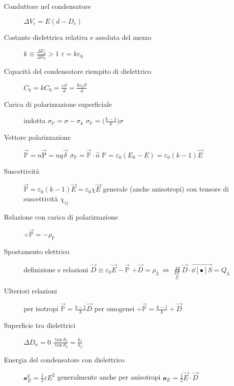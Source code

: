 \documentclass[10pt, oneside]{article}
\begin{document}
\begin{description}
\item[Conduttore nel condensatore] \hfill $\displaystyle \Delta V_c = E (d - D_c)$

\item[Costante dielettrica relativa e assoluta del mezzo] \hfill $\displaystyle k \equiv \frac{\Delta V_0}{\Delta V_k} > 1$ \qquad $\displaystyle \varepsilon = k \varepsilon_0$

\item[Capacità del condensatore riempito di dielettrico] \hfill $\displaystyle C_k = k C_0 = \frac{\varepsilon S}{d} = \frac{k \varepsilon_0 S}{d}$

\item[Carica di polarizzazione superficiale] indotta \hfill $\displaystyle \sigma_{\mathbb{P}} = \sigma - \sigma_k$ \qquad $\displaystyle \sigma_{\mathbb{P}} = \big(\frac{k-1}{k}\big) \sigma$

\item[Vettore polarizzazione] \hfill $\displaystyle \vec{\mathbb{P}} = n \vec{\mathrm{P}} = nq \vec{\delta}$ \qquad $\sigma_{\mathbb{P}} = \vec{\mathbb{P}}  \cdot \hat{n}$ \qquad $\displaystyle \mathbb{P} = \varepsilon_0 (E_0 - E) = \varepsilon_0 (k-1) \vec{E}$ 

\item[Suscettività] \hfill $\displaystyle \vec{\mathbb{P}} = \varepsilon_0 (k-1) \vec{E} = \varepsilon_0 \chi \vec{E}$ \qquad generale (anche anisotropi) con tensore di suscettività $\chi_{ij}$

\item[Relazione con carica di polarizzazione] \hfill $\displaystyle \div \vec{\mathbb{P}} = - \rho_{\mathbb{P}}$

\item[Spostamento elettrico] definizione e relazioni \hfill $\displaystyle \vec{D} \equiv \varepsilon_0 \vec{E} - \vec{\mathbb{P}}$ \qquad $\displaystyle \div \vec{D} = \rho_L \, \Leftrightarrow \, \oiint\limits_{\Sigma} \vec{D} \cdot \vec{\dd[•]{S}} = Q_L$ 

\item[Ulteriori relazioni] \hfill per isotropi $\displaystyle \vec{\mathbb{P}} = \frac{k-1}{k} \vec{D}$ \qquad per omogenei $\displaystyle \div \vec{\mathbb{P}} = \frac{k-1}{k} \div \vec{D}$

\item[Superficie tra dielettrici] \hfill $\displaystyle \Delta D_n = 0$ \qquad $\displaystyle \frac{\tan \theta_1}{\tan \theta_2} = \frac{k_1}{k_2}$

\item[Energia del condensatore con dielettrico] \hfill $\displaystyle \mathcal{u}_E^k = \frac{1}{2} \varepsilon E^2$ \qquad generalmente anche per anisotropi $\displaystyle \mathcal{u}_E = \frac{1}{2} \vec{E} \cdot \vec{D}$

\end{description}
\end{document}
